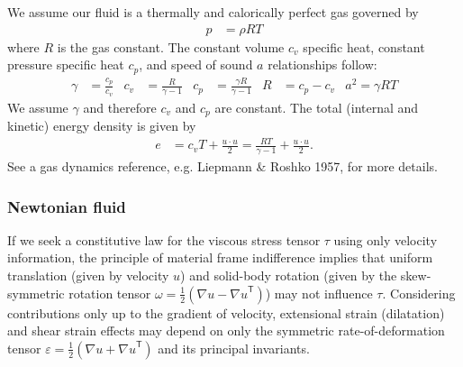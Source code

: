\documentclass[letterpaper,11pt,nointlimits]{amsart}
\newcommand{\trans}[1]{{#1}^{\ensuremath{\mathsf{T}}}}
\begin{document}
We assume our fluid is a thermally and calorically perfect gas governed by
\begin{align}
  \label{eq:perfectgaseos}
  p &= \rho{} R T
\end{align}
where $R$ is the gas constant. The constant volume $c_{v}$ specific heat,
constant pressure specific heat $c_{p}$, and speed of sound $a$ relationships 
follow:
\begin{align}
  \label{eq:perfectgasrelations}
  \gamma &= \frac{c_{p}}{c_{v}}
  &
  c_{v} &= \frac{R}{\gamma - 1}
  &
  c_{p} &= \frac{\gamma{}R}{\gamma-1}
  &
  R &= c_{p} - c_{v}
  &
  a^{2} = \gamma{}RT
\end{align}
We assume $\gamma$ and therefore $c_{v}$ and $c_{p}$ are constant.
The total (internal and kinetic) energy density is given by
\begin{align}
  \label{eq:perfectgastotalenergy}
  e &= c_{v} T + \frac{u\cdot{}u}{2}
     = \frac{RT}{\gamma-1} + \frac{u\cdot{}u}{2}
  .
\end{align}
See a gas dynamics reference, e.g. Liepmann \& Roshko 1957, for more details.

\subsubsection{Newtonian fluid}

If we seek a constitutive law for the viscous stress tensor $\tau$
using only velocity information, the principle of material frame
indifference implies that uniform translation (given by velocity $u$)
and solid-body rotation (given by the skew-symmetric rotation tensor
$\omega=\frac{1}{2}\left( \nabla{}u-\trans{\nabla{}u} \right)$)
may not influence $\tau$.  Considering contributions only up to the
gradient of velocity, extensional strain (dilatation) and shear strain
effects may depend on only the symmetric rate-of-deformation tensor
$\varepsilon=\frac{1}{2}\left( \nabla{}u+\trans{\nabla{}u}\right)$
and its principal invariants.
\end{document}
